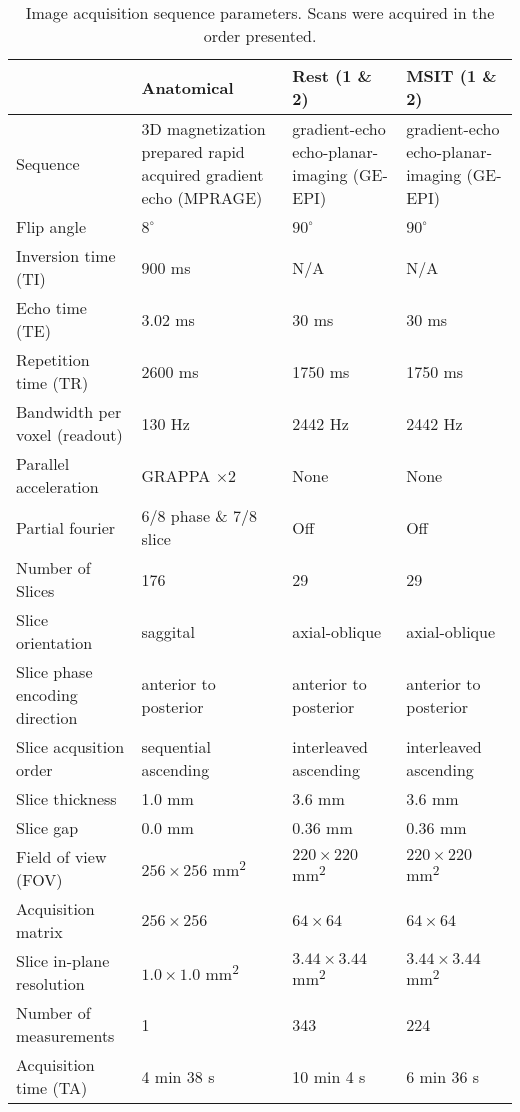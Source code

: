 \begin{table}[ht!]
\centering
\caption{Image acquisition sequence parameters. Scans were acquired in the order presented.}
\label{tab:rest_scan_params}

\small

\begin{tabular}{L{2in}M{1.5in}M{1.5in}M{1.5in}}

\toprule%

& {\bfseries Anatomical}
& {\bfseries Rest (1 \& 2)}
& {\bfseries MSIT (1 \& 2)} \\

\midrule

Sequence & 3D magnetization prepared rapid acquired gradient echo (MPRAGE) & gradient-echo echo-planar-imaging (GE-EPI)  & gradient-echo echo-planar-imaging (GE-EPI) \\
Flip angle & $8^\circ$ & $90^\circ$ & $90^\circ$ \\
Inversion time (TI) & 900 \si{\milli\second} & N/A & N/A \\
Echo time (TE) & 3.02 \si{\milli\second} & 30 \si{\milli\second} & 30 \si{\milli\second} \\ 
Repetition time (TR) & 2600 \si{\milli\second} & 1750 \si{\milli\second} & 1750 \si{\milli\second} \\
Bandwidth per voxel (readout) & 130 \si{\hertz} & 2442 \si{\hertz} & 2442 \si{\hertz} \\
Parallel acceleration & GRAPPA $\times 2$ & None & None \\
Partial fourier & 6/8 phase \& 7/8 slice & Off & Off \\
Number of Slices & 176 & 29 & 29 \\
Slice orientation & saggital & axial-oblique & axial-oblique \\
Slice phase encoding direction & anterior to posterior & anterior to posterior & anterior to posterior \\
Slice acqusition order & sequential ascending & interleaved ascending & interleaved ascending \\
Slice thickness & 1.0 \si{\milli\meter} & 3.6 \si{\milli\meter} & 3.6 \si{\milli\meter} \\
Slice gap & 0.0 \si{\milli\meter} & 0.36 \si{\milli\meter} & 0.36 \si{\milli\meter} \\
Field of view (FOV) & $256 \times 256$ \si{\milli\meter\squared} & $220 \times 220$ \si{\milli\meter\squared} & 
    $220 \times 220$ \si{\milli\meter\squared} \\
Acquisition matrix & $256 \times 256$ & $64 \times 64$ & $64 \times 64$ \\
Slice in-plane resolution & $1.0 \times 1.0$ \si{\milli\meter\squared} & $3.44 \times 3.44$ \si{\milli\meter\squared} &
    $3.44 \times 3.44$ \si{\milli\meter\squared} \\
Number of measurements & 1 & 343 & 224 \\
Acquisition time (TA) & 4 \si{\minute} 38 \si{\second} & 10 \si{\minute} 4 \si{\second} &
    6 \si{\minute} 36 \si{\second} \\ 

\bottomrule    
\end{tabular}

\end{table}